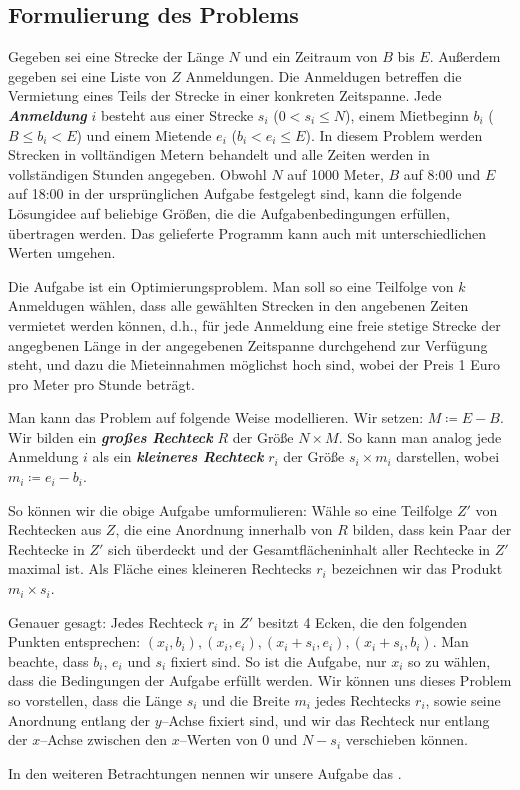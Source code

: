 \subsection{Formulierung des Problems}\label{sec:definitionen}
Gegeben sei eine Strecke der Länge $N$ und ein Zeitraum von $B$ bis $E$.
Außerdem gegeben sei eine Liste von $Z$ Anmeldungen. 
Die Anmeldugen betreffen die Vermietung eines Teils der Strecke in einer konkreten Zeitspanne.
Jede \textbf{\textit{Anmeldung}} $i$ besteht aus einer Strecke $s_i$ ($0 < s_i \leqslant N$),
einem Mietbeginn $b_i$ ($B \leqslant b_i < E$) und einem Mietende $e_i$ ($b_i < e_i \leqslant E$).
In diesem Problem werden Strecken in volltändigen Metern behandelt 
und alle Zeiten werden in vollständigen Stunden angegeben.
Obwohl $N$ auf 1000 Meter, $B$ auf 8:00 und $E$ auf 18:00 in der ursprünglichen Aufgabe festgelegt sind,
kann die folgende Lösungidee auf beliebige Größen, die die Aufgabenbedingungen erfüllen, übertragen werden.
Das gelieferte Programm kann auch mit unterschiedlichen Werten umgehen.

Die Aufgabe ist ein Optimierungsproblem.
Man soll so eine Teilfolge von $k$ Anmeldugen wählen,
dass alle gewählten Strecken in den angebenen Zeiten vermietet werden können, d.h.,
für jede Anmeldung eine freie stetige Strecke der angegbenen Länge 
in der angegebenen Zeitspanne durchgehend zur Verfügung steht,
und dazu die Mieteinnahmen möglichst hoch sind, wobei der Preis 1 Euro pro Meter pro Stunde beträgt.

Man kann das Problem auf folgende Weise modellieren. 
Wir setzen: $M \coloneqq E - B$.
Wir bilden ein \textit{\textbf{großes Rechteck}} $R$ der Größe $N \times M$.
So kann man analog jede Anmeldung $i$ als ein \textit{\textbf{kleineres Rechteck}}
$r_i$ der Größe $s_i \times m_i$ darstellen, wobei $m_i \coloneqq e_i - b_i$.

So können wir die obige Aufgabe umformulieren:
Wähle so eine Teilfolge $Z'$ von Rechtecken aus $Z$,
die eine Anordnung innerhalb von $R$ bilden,
dass kein Paar der Rechtecke in $Z'$ sich überdeckt und
der Gesamtflächeninhalt aller Rechtecke in $Z'$ maximal ist.
Als Fläche eines kleineren Rechtecks $r_i$ bezeichnen wir das Produkt $m_i \times s_i$.

Genauer gesagt: Jedes Rechteck $r_i$ in $Z'$ besitzt 4 Ecken,
die den folgenden Punkten entsprechen:
$(x_i, b_i), (x_i, e_i), (x_i + s_i, e_i), (x_i + s_i, b_i)$.
Man beachte, dass $b_i$, $e_i$ und $s_i$ fixiert sind. 
So ist die Aufgabe, nur $x_i$ so zu wählen, dass die Bedingungen der Aufgabe erfüllt werden.
Wir können uns dieses Problem so vorstellen, dass die Länge $s_i$ und die Breite $m_i$
jedes Rechtecks $r_i$, sowie seine Anordnung entlang der $y$--Achse fixiert sind,
und wir das Rechteck nur entlang der $x$--Achse zwischen den $x$--Werten von 0 und $N-s_i$ verschieben können.

In den weiteren Betrachtungen nennen wir unsere Aufgabe das \fp.